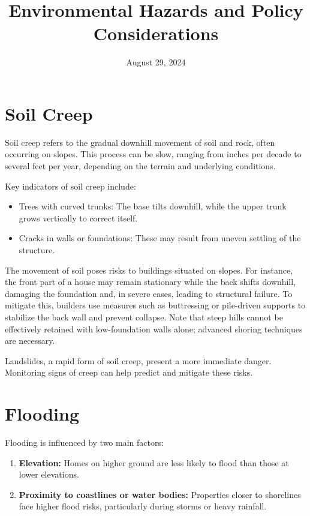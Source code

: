 \documentclass[12pt]{article}
\begin{document}
\title{Environmental Hazards and Policy Considerations}
\author{}
\date{August 29, 2024}
\maketitle

\section{Soil Creep}
Soil creep refers to the gradual downhill movement of soil and rock, often occurring on slopes. This process can be slow, ranging from inches per decade to several feet per year, depending on the terrain and underlying conditions.

Key indicators of soil creep include:
\begin{itemize}
    \item Trees with curved trunks: The base tilts downhill, while the upper trunk grows vertically to correct itself.
    \item Cracks in walls or foundations: These may result from uneven settling of the structure.
\end{itemize}

The movement of soil poses risks to buildings situated on slopes. For instance, the front part of a house may remain stationary while the back shifts downhill, damaging the foundation and, in severe cases, leading to structural failure. To mitigate this, builders use measures such as buttressing or pile-driven supports to stabilize the back wall and prevent collapse. Note that steep hills cannot be effectively retained with low-foundation walls alone; advanced shoring techniques are necessary.

Landslides, a rapid form of soil creep, present a more immediate danger. Monitoring signs of creep can help predict and mitigate these risks.

\section{Flooding}
Flooding is influenced by two main factors:
\begin{enumerate}
    \item \textbf{Elevation:} Homes on higher ground are less likely to flood than those at lower elevations.
    \item \textbf{Proximity to coastlines or water bodies:} Properties closer to shorelines face higher flood risks, particularly during storms or heavy rainfall.
\end{enumerate}
\end{document}
